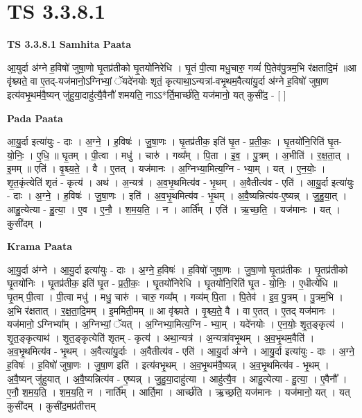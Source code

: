 \documentclass[17pt]{extarticle}
\begin{document}
\section{ TS 3.3.8.1 }

\textbf{TS 3.3.8.1 } \newline
\textbf{Samhita Paata} \newline

आ॒युर्दा अ॑ग्ने ह॒विषो॑ जुषा॒णो घृ॒तप्र॑तीको घृ॒तयो॑निरेधि । घृ॒तं पी॒त्वा मधु॒चारु॒ गव्यं॑ पि॒तेव॑पु॒त्रम॒भि र॑क्षतादि॒मं ॥आ वृ॑श्च्यते॒ वा ए॒तद्-यज॑मानो॒ऽग्निभ्यां॒ ॅयदे॑नयोः शृतं॒ कृत्याथा॒ऽन्यत्रा॑-वभृ॒थम॒वैत्या॑यु॒र्दा अ॑ग्ने ह॒विषो॑ जुषा॒ण इत्य॑वभृ॒थम॑वै॒ष्यन् जु॑हुया॒दाहु॑त्यै॒वैनौ॑ शमयति॒ नाऽऽ*र्ति॒मार्च्छ॑ति॒ यज॑मानो॒ यत् कुसी॑द॒ - [  ] \newline

\textbf{Pada Paata} \newline

आ॒यु॒र्दा इत्या॑युः - दाः । अ॒ग्ने॒ । ह॒विषः॑ । जु॒षा॒णः । घृ॒तप्र॑तीक॒ इति॑ घृ॒त - प्र॒ती॒कः॒ । घृ॒तयो॑नि॒रिति॑ घृ॒त-यो॒निः॒ । ए॒धि॒ ॥ घृ॒तम् । पी॒त्वा । मधु॑ । चारु॑ । गव्य᳚म् । पि॒ता । इ॒व॒ । पु॒त्रम् । अ॒भीति॑ । र॒क्ष॒ता॒त् । इ॒मम् ॥ एति॑ । वृ॒श्च्य॒ते॒ । वै । ए॒तत् । यज॑मानः । अ॒ग्निभ्या॒मित्य॒ग्नि - भ्या॒म् । यत् । ए॒न॒योः॒ । शृ॒त॒कृंत्येति॑ शृतं - कृत्य॑ । अथ॑ । अ॒न्यत्र॑ । अ॒व॒भृ॒थमित्य॑व - भृ॒थम् । अ॒वैतीत्य॑व - एति॑ । आ॒यु॒र्दा इत्या॑युः - दाः । अ॒ग्ने॒ । ह॒विषः॑ । जु॒षा॒णः । इति॑ । अ॒व॒भृ॒थमित्य॑व - भृ॒थम् । अ॒वै॒ष्यन्नित्य॑व-ए॒ष्यन्न् । जु॒हु॒या॒त् । आहु॒त्येत्या - हु॒त्या॒ । ए॒व । ए॒नौ॒ । श॒म॒य॒ति॒ । न । आर्ति᳚म् । एति॑ । ऋ॒च्छ॒ति॒ । यज॑मानः । यत् । कुसी॑दम् ।  \newline


\textbf{Krama Paata} \newline

आ॒यु॒र्दा अ॑ग्ने । आ॒यु॒र्दा इत्या॑युः - दाः । अ॒ग्ने॒ ह॒विषः॑ । ह॒विषो॑ जुषा॒णः । जु॒षा॒णो घृ॒तप्र॑तीकः । घृ॒तप्र॑तीको घृ॒तयो॑निः । घृ॒तप्र॑तीक॒ इति॑ घृ॒त - प्र॒ती॒कः॒ । घृ॒तयो॑निरेधि । घृ॒तयो॑नि॒रिति॑ घृ॒त - यो॒निः॒ । ए॒धीत्ये॑धि ॥ घृ॒तम् पी॒त्वा । पी॒त्वा मधु॑ । मधु॒ चारु॑ । चारु॒ गव्य᳚म् । गव्य॑म् पि॒ता । पि॒तेव॑ । इ॒व॒ पु॒त्रम् । पु॒त्रम॒भि । अ॒भि र॑क्षतात् । र॒क्ष॒ता॒दि॒मम् । इ॒ममिती॒मम् ॥ आ वृ॑श्च्यते । वृ॒श्च्य॒ते॒ वै । वा ए॒तत् । ए॒तद् यज॑मानः । यज॑मानो॒ ऽग्निभ्या᳚म् । अ॒ग्निभ्यां॒ ॅयत् । अ॒ग्निभ्या॒मित्य॒ग्नि - भ्या॒म् । यदे॑नयोः । ए॒न॒योः॒ शृ॒त॒ङ्कृत्य॑ । शृ॒त॒ङ्कृत्याथ॑ । शृ॒त॒ङ्कृत्येति॑ शृतम् - कृत्य॑ । अथा॒न्यत्र॑ । अ॒न्यत्रा॑वभृ॒थम् । अ॒व॒भृ॒थम॒वैति॑ । अ॒व॒भृ॒थमित्य॑व - भृ॒थम् । अ॒वैत्या॑यु॒र्दाः । अ॒वैतीत्य॑व - एति॑ । आ॒यु॒र्दा अ॑ग्ने । आ॒यु॒र्दा इत्या॑युः - दाः । अ॒ग्ने॒ ह॒विषः॑ । ह॒विषो॑ जुषा॒णः । जु॒षा॒ण इति॑ । इत्य॑वभृ॒थम् । अ॒व॒भृ॒थम॑वै॒ष्यन्न् । अ॒व॒भृ॒थमित्य॑व - भृ॒थम् । अ॒वै॒ष्यन् जु॑हुयात् । अ॒वै॒ष्यन्नित्य॑व - ए॒ष्यन्न् । जु॒हु॒या॒दाहु॑त्या । आहु॑त्यै॒व । आहु॒त्येत्या - हु॒त्या॒ । ए॒वैनौ᳚ । ए॒नौ॒ श॒म॒य॒ति॒ । श॒म॒य॒ति॒ न । नार्ति᳚म् । आर्ति॒मा । आर्च्छ॑ति । ऋ॒च्छ॒ति॒ यज॑मानः । यज॑मानो॒ यत् । यत् कुसी॑दम् । कुसी॑द॒मप्र॑तीत्तम् \newline
\end{document}
